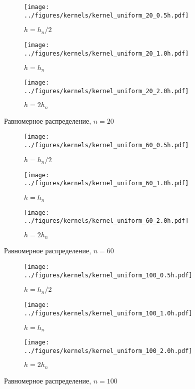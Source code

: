 \documentclass[12pt]{report}
\begin{document}
	\begin{figure}[H]
		\centering
		\begin{subfigure}[t]{.3\linewidth}
			\centering\texttt{[image: ../figures/kernels/kernel\_uniform\_20\_0.5h.pdf]}
			\caption*{$h = h_n/2$}
		\end{subfigure}
		\begin{subfigure}[t]{.3\linewidth}
			\centering\texttt{[image: ../figures/kernels/kernel\_uniform\_20\_1.0h.pdf]}
			\caption*{$h = h_n$}
		\end{subfigure}
		\begin{subfigure}[t]{.3\linewidth}
			\centering\texttt{[image: ../figures/kernels/kernel\_uniform\_20\_2.0h.pdf]}
			\caption*{$h = 2h_n$}
		\end{subfigure}
		\caption{Равномерное распределение, $n = 20$}
	\end{figure}
	\begin{figure}[H]
		\centering
		\begin{subfigure}[t]{.3\linewidth}
			\centering\texttt{[image: ../figures/kernels/kernel\_uniform\_60\_0.5h.pdf]}
			\caption*{$h = h_n/2$}
		\end{subfigure}
		\begin{subfigure}[t]{.3\linewidth}
			\centering\texttt{[image: ../figures/kernels/kernel\_uniform\_60\_1.0h.pdf]}
			\caption*{$h = h_n$}
		\end{subfigure}
		\begin{subfigure}[t]{.3\linewidth}
			\centering\texttt{[image: ../figures/kernels/kernel\_uniform\_60\_2.0h.pdf]}
			\caption*{$h = 2h_n$}
		\end{subfigure}
		\caption{Равномерное распределение, $n = 60$}
	\end{figure}
	\begin{figure}[H]
		\centering
		\begin{subfigure}[t]{.3\linewidth}
			\centering\texttt{[image: ../figures/kernels/kernel\_uniform\_100\_0.5h.pdf]}
			\caption*{$h = h_n/2$}
		\end{subfigure}
		\begin{subfigure}[t]{.3\linewidth}
			\centering\texttt{[image: ../figures/kernels/kernel\_uniform\_100\_1.0h.pdf]}
			\caption*{$h = h_n$}
		\end{subfigure}
		\begin{subfigure}[t]{.3\linewidth}
			\centering\texttt{[image: ../figures/kernels/kernel\_uniform\_100\_2.0h.pdf]}
			\caption*{$h = 2h_n$}
		\end{subfigure}
		\caption{Равномерное распределение, $n = 100$}
	\end{figure}
	
\end{document}
